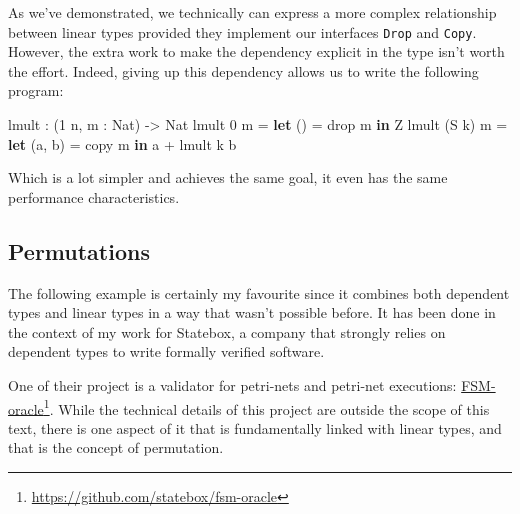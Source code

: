 \documentclass[
]{article}
\newenvironment{Shaded}{}{}
\newcommand{\DataTypeTok}[1]{\textcolor[rgb]{0.56,0.13,0.00}{#1}}
\newcommand{\DecValTok}[1]{\textcolor[rgb]{0.25,0.63,0.44}{#1}}
\newcommand{\FunctionTok}[1]{\textcolor[rgb]{0.02,0.16,0.49}{#1}}
\newcommand{\KeywordTok}[1]{\textcolor[rgb]{0.00,0.44,0.13}{\textbf{#1}}}
\newcommand{\NormalTok}[1]{#1}
\newcommand{\OperatorTok}[1]{\textcolor[rgb]{0.40,0.40,0.40}{#1}}
\newcommand{\OtherTok}[1]{\textcolor[rgb]{0.00,0.44,0.13}{#1}}
\begin{document}
As we've demonstrated, we technically can express a more complex
relationship between linear types provided they implement our interfaces
\texttt{Drop} and \texttt{Copy}. However, the extra work to make the
dependency explicit in the type isn't worth the effort. Indeed, giving
up this dependency allows us to write the following program:

\begin{Shaded}
\begin{Highlighting}[]
\NormalTok{lmult }\OperatorTok{:}\NormalTok{ (}\DecValTok{1}\NormalTok{ n, m }\OperatorTok{:} \DataTypeTok{Nat}\NormalTok{) }\OtherTok{{-}\textgreater{}} \DataTypeTok{Nat}
\NormalTok{lmult }\DecValTok{0}\NormalTok{ m }\OtherTok{=} \KeywordTok{let}\NormalTok{ () }\OtherTok{=} \FunctionTok{drop}\NormalTok{ m }\KeywordTok{in} \DataTypeTok{Z}
\NormalTok{lmult (}\DataTypeTok{S}\NormalTok{ k) m }\OtherTok{=} \KeywordTok{let}\NormalTok{ (a, b) }\OtherTok{=}\NormalTok{ copy m }\KeywordTok{in}\NormalTok{ a }\OperatorTok{+}\NormalTok{ lmult k b}
\end{Highlighting}
\end{Shaded}

Which is a lot simpler and achieves the same goal, it even has the same
performance characteristics.

\hypertarget{permutations}{%
\subsection{Permutations}\label{permutations}}

The following example is certainly my favourite since it combines both
dependent types and linear types in a way that wasn't possible before.
It has been done in the context of my work for Statebox, a company that
strongly relies on dependent types to write formally verified software.

One of their project is a validator for petri-nets\cite{petri-nets} and
petri-net executions:
\href{https://github.com/statebox/fsm-oracle}{FSM-oracle}\footnote{\url{https://github.com/statebox/fsm-oracle}}.
While the technical details of this project are outside the scope of
this text, there is one aspect of it that is fundamentally linked with
linear types, and that is the concept of permutation.
\end{document}
